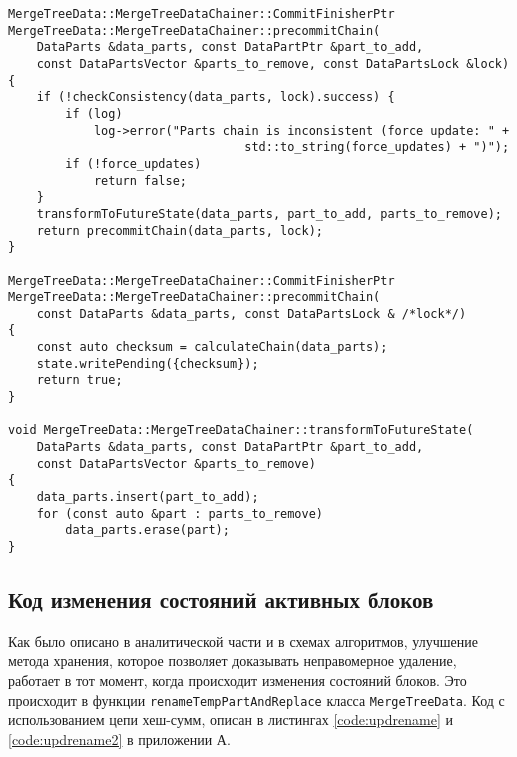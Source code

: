 \begin{lstlisting}[label=code:precommitChain, caption={Метод \texttt{precommitChain}.}]
MergeTreeData::MergeTreeDataChainer::CommitFinisherPtr
MergeTreeData::MergeTreeDataChainer::precommitChain(
    DataParts &data_parts, const DataPartPtr &part_to_add,
    const DataPartsVector &parts_to_remove, const DataPartsLock &lock)
{
    if (!checkConsistency(data_parts, lock).success) {
        if (log)
            log->error("Parts chain is inconsistent (force update: " +
                                 std::to_string(force_updates) + ")");
        if (!force_updates)
            return false;
    }
    transformToFutureState(data_parts, part_to_add, parts_to_remove);
    return precommitChain(data_parts, lock);
}

MergeTreeData::MergeTreeDataChainer::CommitFinisherPtr
MergeTreeData::MergeTreeDataChainer::precommitChain(
    const DataParts &data_parts, const DataPartsLock & /*lock*/)
{
    const auto checksum = calculateChain(data_parts);
    state.writePending({checksum});
    return true;
}

void MergeTreeData::MergeTreeDataChainer::transformToFutureState(
    DataParts &data_parts, const DataPartPtr &part_to_add,
    const DataPartsVector &parts_to_remove)
{
    data_parts.insert(part_to_add);
    for (const auto &part : parts_to_remove)
        data_parts.erase(part);
}
\end{lstlisting}

\subsection{Код изменения состояний активных блоков}

Как было описано в аналитической части и в схемах алгоритмов, улучшение метода хранения, которое позволяет доказывать неправомерное удаление, работает в тот момент, когда происходит изменения состояний блоков. Это происходит в функции \texttt{renameTempPartAndReplace} класса \texttt{MergeTreeData}. Код с использованием цепи хеш-сумм, описан в листингах \ref{code:updrename} и \ref{code:updrename2} в приложении А.

\pagebreak